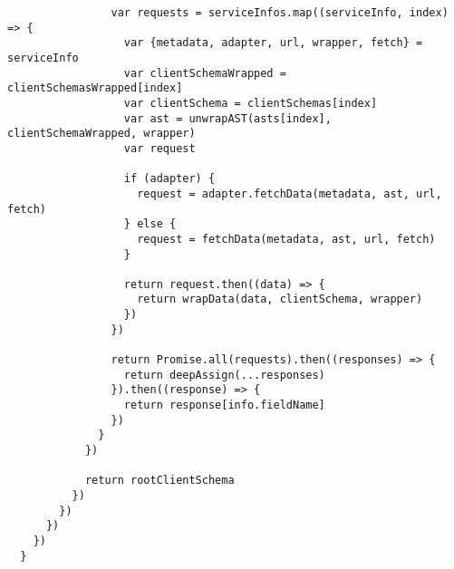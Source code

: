 \begin{verbatim}
                var requests = serviceInfos.map((serviceInfo, index) => {
                  var {metadata, adapter, url, wrapper, fetch} = serviceInfo
                  var clientSchemaWrapped = clientSchemasWrapped[index]
                  var clientSchema = clientSchemas[index]
                  var ast = unwrapAST(asts[index], clientSchemaWrapped, wrapper)
                  var request

                  if (adapter) {
                    request = adapter.fetchData(metadata, ast, url, fetch)
                  } else {
                    request = fetchData(metadata, ast, url, fetch)
                  }

                  return request.then((data) => {
                    return wrapData(data, clientSchema, wrapper)
                  })
                })

                return Promise.all(requests).then((responses) => {
                  return deepAssign(...responses)
                }).then((response) => {
                  return response[info.fieldName]
                })
              }
            })

            return rootClientSchema
          })
        })
      })
    })
  }
\end{verbatim}
